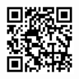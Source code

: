 \documentclass[11pt]{book}
\begin{document}



 

\begin{figure}[bp]
\begin{center}
	\includegraphics[width=3cm]{../Image/QrCode/github-page}
\end{center}

\bigskip

\hfill 
\end{figure}

\newpage

\clearpage
{}
	
\end{document}
